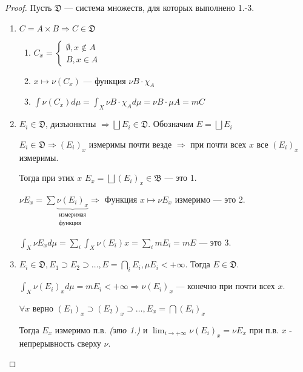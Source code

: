\begin{proof}
    Пусть \(\mathfrak{D}\) --- система множеств, для которых выполнено 1.-3.

    \begin{enumerate}
        \item \(C = A \times B \Rightarrow C\in \mathfrak{D}\)

              \begin{enumerate}
                  \item \(C_x = \begin{cases}
                            \emptyset, x\notin A \\
                            B, x\in A
                        \end{cases}\)
                  \item \(x \mapsto \nu(C_x)\) --- функция \(\nu B \cdot \chi_A\)
                  \item \(\int \nu(C_x) d\mu = \int_X \nu B \cdot \chi_A d \mu = \nu B \cdot \mu A = mC\)
              \end{enumerate}

        \item \(E_i \in \mathfrak{D}\), дизъюнктны \( \Rightarrow \bigsqcup E_i\in \mathfrak{D}\). Обозначим \(E = \bigsqcup E_i\)

              \(E_i \in \mathfrak{D} \Rightarrow (E_i)_x\) измеримы почти везде \( \Rightarrow \) при почти всех \(x\) все \((E_i)_x\) измеримы.

              Тогда при этих \(x\) \(E_x = \bigsqcup (E_i)_x \in \mathfrak{B}\) --- это 1.

              \(\nu E_x = \sum \underbrace{\nu(E_i)_x}_{\substack{\text{измеримая} \\ \text{функция}}} \Rightarrow\) Функция \(x \mapsto \nu E_x\) измеримо --- это 2.

              \(\int_X \nu E_x d\mu = \sum_i \int_X \nu(E_i) x = \sum_i m E_i = m E\) --- это 3.

        \item \(E_i \in \mathfrak{D}, E_1 \supset E_2 \supset \dots , E = \bigcap_i E_i, \mu E_i < +\infty\). Тогда \(E\in \mathfrak{D}\).

              \(\int_X \nu(E_i)_x d\mu = m E_i < +\infty \Rightarrow \nu(E_i)_x\) --- конечно при почти всех \(x\).

              \(\forall x\) верно \((E_1)_x \supset (E_2)_x \supset \dots , E_x = \bigcap (E_i)_x\)

              Тогда \(E_x\) измеримо п.в. \textit{(это 1.)} и \(\lim_{i \to +\infty} \nu(E_i)_x = \nu E_x\) при п.в. \(x\) - непрерывность сверху \(\nu\).


\end{enumerate}
\end{proof}
